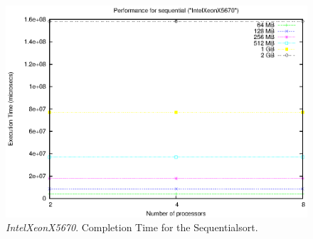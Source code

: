 \begin{figure}[t]
    \begin{center}
        \includegraphics[scale=0.6]{plots/test_01_IntelXeonX5670/NxTxM/sequential_IntelXeonX5670_NxTxM_huge}
    \end{center}
    \caption{\textit{IntelXeonX5670}. Completion Time for the Sequentialsort.}
    \label{sequential-IntelXeonX5670}
\end{figure}

